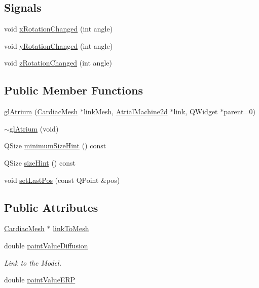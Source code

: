 \subsection*{Signals}
\begin{DoxyCompactItemize}
\item 
void \hyperlink{classgl_atrium_add3c45ba71308914e62ac5f07d9dbce4}{x\+Rotation\+Changed} (int angle)
\item 
void \hyperlink{classgl_atrium_a12abcdbba73ff41ea8efdbbdcdbdcb6c}{y\+Rotation\+Changed} (int angle)
\item 
void \hyperlink{classgl_atrium_a71703a9bcfb404b9aa1bdab789573c7e}{z\+Rotation\+Changed} (int angle)
\end{DoxyCompactItemize}
\subsection*{Public Member Functions}
\begin{DoxyCompactItemize}
\item 
\hyperlink{classgl_atrium_a68d308b0209b6111bbbcbb56b1a5e10c}{gl\+Atrium} (\hyperlink{class_cardiac_mesh}{Cardiac\+Mesh} $\ast$link\+Mesh, \hyperlink{class_atrial_machine2d}{Atrial\+Machine2d} $\ast$link, Q\+Widget $\ast$parent=0)
\item 
\hyperlink{classgl_atrium_aab01fe62e0f7734e3b91b42a11d32db7}{$\sim$gl\+Atrium} (void)
\item 
Q\+Size \hyperlink{classgl_atrium_acf3a401dfd3ca09d8dcb36886f306ba9}{minimum\+Size\+Hint} () const 
\item 
Q\+Size \hyperlink{classgl_atrium_a0e7fc813e7c9ae4d47317109815b9705}{size\+Hint} () const 
\item 
void \hyperlink{classgl_atrium_aef6b55dd9c8a5b542c034d7bb8e6d319}{set\+Last\+Pos} (const Q\+Point \&pos)
\end{DoxyCompactItemize}
\subsection*{Public Attributes}
\begin{DoxyCompactItemize}
\item 
\hyperlink{class_cardiac_mesh}{Cardiac\+Mesh} $\ast$ \hyperlink{classgl_atrium_a8ded24946b8c91b4e1fb7f4f0545a6b0}{link\+To\+Mesh}
\item 
double \hyperlink{classgl_atrium_a2dc7a9f9a09eeb04eee7fd51e2b6d889}{paint\+Value\+Diffusion}
\begin{DoxyCompactList}\small\item\em Link to the Model. \end{DoxyCompactList}\item 
double \hyperlink{classgl_atrium_a501f9f86fd740a933a6e20efad9ff599}{paint\+Value\+E\+R\+P}
\end{DoxyCompactItemize}
